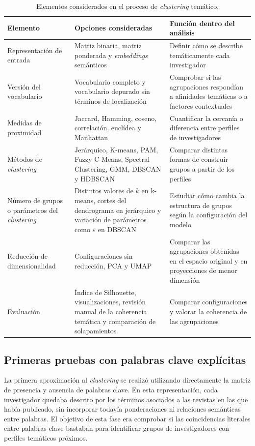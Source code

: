 \documentclass[11pt,spanish,listoffigures,listoftables]{tfgetsinf}
\begin{document}
\begin{table}[H]
\centering
\small
\renewcommand{\arraystretch}{1.05}
\begin{tabular}{
>{\centering\arraybackslash}m{}
m{}
m{}
}
\hline
\textbf{Elemento} & \textbf{Opciones consideradas} & \textbf{Función dentro del análisis} \\
\hline
Representación de entrada & Matriz binaria, matriz ponderada y \textit{embeddings} semánticos & Definir cómo se describe temáticamente cada investigador \\
\hline
Versión del vocabulario & Vocabulario completo y vocabulario depurado sin términos de localización & Comprobar si las agrupaciones respondían a afinidades temáticas o a factores contextuales \\
\hline
Medidas de proximidad & Jaccard, Hamming, coseno, correlación, euclídea y Manhattan & Cuantificar la cercanía o diferencia entre perfiles de investigadores \\
\hline
Métodos de \textit{clustering} & Jerárquico, K-means, PAM, Fuzzy C-Means, Spectral Clustering, GMM, DBSCAN y HDBSCAN & Comparar distintas formas de construir grupos a partir de los perfiles \\
\hline
Número de grupos o parámetros del \textit{clustering} & Distintos valores de \(k\) en k-means, cortes del dendrograma en jerárquico y variación de parámetros como \(\varepsilon\) en DBSCAN & Estudiar cómo cambia la estructura de grupos según la configuración del modelo \\
\hline
Reducción de dimensionalidad & Configuraciones sin reducción, PCA y UMAP & Comparar las agrupaciones obtenidas en el espacio original y en proyecciones de menor dimensión \\
\hline
Evaluación & Índice de Silhouette, visualizaciones, revisión manual de la coherencia temática y comparación de solapamientos & Comparar configuraciones y valorar la coherencia de las agrupaciones \\
\hline
\end{tabular}
\caption{Elementos considerados en el proceso de \textit{clustering} temático.}
\label{tab:elementos_clustering}
\end{table}

\subsection{Primeras pruebas con palabras clave explícitas}

La primera aproximación al \textit{clustering} se realizó utilizando directamente la matriz de presencia y ausencia de palabras clave. En esta representación, cada investigador quedaba descrito por los términos asociados a las revistas en las que había publicado, sin incorporar todavía ponderaciones ni relaciones semánticas entre palabras. El objetivo de esta fase era comprobar si las coincidencias literales entre palabras clave bastaban para identificar grupos de investigadores con perfiles temáticos próximos.
\end{document}
